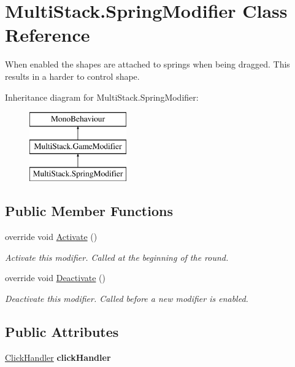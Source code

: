 \hypertarget{class_multi_stack_1_1_spring_modifier}{}\section{Multi\+Stack.\+Spring\+Modifier Class Reference}
\label{class_multi_stack_1_1_spring_modifier}


When enabled the shapes are attached to springs when being dragged. This results in a harder to control shape.  


Inheritance diagram for Multi\+Stack.\+Spring\+Modifier\+:\begin{figure}[H]
\begin{center}
\leavevmode
\includegraphics[height=3.000000cm]{class_multi_stack_1_1_spring_modifier}
\end{center}
\end{figure}
\subsection*{Public Member Functions}
\begin{DoxyCompactItemize}
\item 
override void \hyperlink{class_multi_stack_1_1_spring_modifier_ac96460f57d038035461804282c110040}{Activate} ()
\begin{DoxyCompactList}\small\item\em Activate this modifier. Called at the beginning of the round. \end{DoxyCompactList}\item 
override void \hyperlink{class_multi_stack_1_1_spring_modifier_ae6aaf8c2806a1c844b1700977efb2dbc}{Deactivate} ()
\begin{DoxyCompactList}\small\item\em Deactivate this modifier. Called before a new modifier is enabled. \end{DoxyCompactList}\end{DoxyCompactItemize}
\subsection*{Public Attributes}
\begin{DoxyCompactItemize}
\item 
\hypertarget{class_multi_stack_1_1_spring_modifier_a365b9a4fe8ad8e9d999eb434e076efa9}{}\hyperlink{class_multi_stack_1_1_click_handler}{Click\+Handler} {\bfseries click\+Handler}\label{class_multi_stack_1_1_spring_modifier_a365b9a4fe8ad8e9d999eb434e076efa9}

\end{DoxyCompactItemize}


